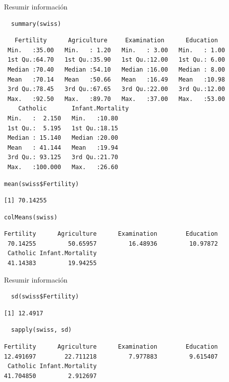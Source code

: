 \documentclass[xcolor={usenames,svgnames,dvipsnames}]{beamer}
\begin{document}
\begin{frame}[fragile,label=sec-2-1]{Resumir información}
 \lstset{language=R,label= ,caption= ,numbers=none}
\begin{lstlisting}
  summary(swiss)
\end{lstlisting}

\begin{verbatim}
   Fertility      Agriculture     Examination      Education    
 Min.   :35.00   Min.   : 1.20   Min.   : 3.00   Min.   : 1.00  
 1st Qu.:64.70   1st Qu.:35.90   1st Qu.:12.00   1st Qu.: 6.00  
 Median :70.40   Median :54.10   Median :16.00   Median : 8.00  
 Mean   :70.14   Mean   :50.66   Mean   :16.49   Mean   :10.98  
 3rd Qu.:78.45   3rd Qu.:67.65   3rd Qu.:22.00   3rd Qu.:12.00  
 Max.   :92.50   Max.   :89.70   Max.   :37.00   Max.   :53.00  
    Catholic       Infant.Mortality
 Min.   :  2.150   Min.   :10.80   
 1st Qu.:  5.195   1st Qu.:18.15   
 Median : 15.140   Median :20.00   
 Mean   : 41.144   Mean   :19.94   
 3rd Qu.: 93.125   3rd Qu.:21.70   
 Max.   :100.000   Max.   :26.60
\end{verbatim}

\lstset{language=R,label= ,caption= ,numbers=none}
\begin{lstlisting}
mean(swiss$Fertility)
\end{lstlisting}

\begin{verbatim}
[1] 70.14255
\end{verbatim}

\lstset{language=R,label= ,caption= ,numbers=none}
\begin{lstlisting}
colMeans(swiss)
\end{lstlisting}

\begin{verbatim}
Fertility      Agriculture      Examination        Education 
 70.14255         50.65957         16.48936         10.97872 
 Catholic Infant.Mortality 
 41.14383         19.94255
\end{verbatim}
\end{frame}

\begin{frame}[fragile,label=sec-2-2]{Resumir información}
 \lstset{language=R,label= ,caption= ,numbers=none}
\begin{lstlisting}
  sd(swiss$Fertility)
\end{lstlisting}

\begin{verbatim}
[1] 12.4917
\end{verbatim}

\lstset{language=R,label= ,caption= ,numbers=none}
\begin{lstlisting}
  sapply(swiss, sd)
\end{lstlisting}

\begin{verbatim}
Fertility      Agriculture      Examination        Education 
12.491697        22.711218         7.977883         9.615407 
 Catholic Infant.Mortality 
41.704850         2.912697
\end{verbatim}
\end{frame}
\end{document}

